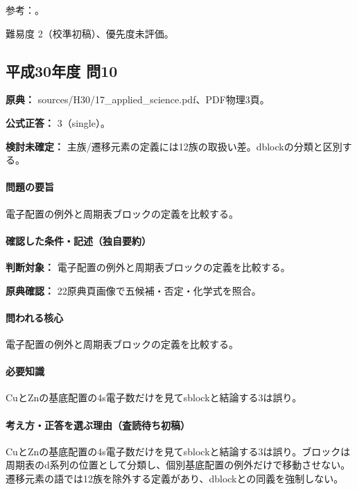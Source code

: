 \par 参考：\cite{atomic_nist2019,inorganic_periodic_ref}。

\par 難易度 2（校準初稿）、優先度未評価。

\subsection{平成30年度 問10}
\label{q:h30-reg-applied-10}

\noindent\textbf{原典：} sources/H30/17\_applied\_science.pdf、PDF物理3頁。

\textbf{公式正答：} 3（single）。

\par\textbf{検討未確定：} 主族/遷移元素の定義には12族の取扱い差。dblockの分類と区別する。

\paragraph{問題の要旨} 電子配置の例外と周期表ブロックの定義を比較する。

\paragraph{確認した条件・記述（独自要約）}\mbox{}\par

\noindent\textbf{判断対象：} 電子配置の例外と周期表ブロックの定義を比較する。\par

\noindent\textbf{原典確認：} 22原典頁画像で五候補・否定・化学式を照合。\par

\paragraph{問われる核心} 電子配置の例外と周期表ブロックの定義を比較する。

\paragraph{必要知識} CuとZnの基底配置の4s電子数だけを見てsblockと結論する3は誤り。

\paragraph{考え方・正答を選ぶ理由（査読待ち初稿）} CuとZnの基底配置の4s電子数だけを見てsblockと結論する3は誤り。ブロックは周期表のd系列の位置として分類し、個別基底配置の例外だけで移動させない。遷移元素の語では12族を除外する定義があり、dblockとの同義を強制しない。

